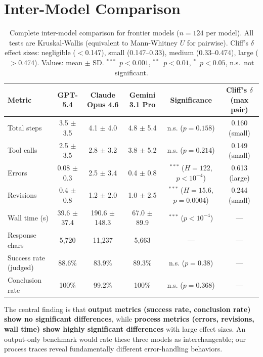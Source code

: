 \documentclass{article}
\begin{document}
\section{Inter-Model Comparison}
\label{app:models}

\begin{table}[h]
\caption{Complete inter-model comparison for frontier models ($n{=}124$ per model). All tests are Kruskal-Wallis (equivalent to Mann-Whitney $U$ for pairwise). Cliff's $\delta$ effect sizes: negligible ($<$0.147), small (0.147--0.33), medium (0.33--0.474), large ($>$0.474). Values: mean $\pm$ SD. $^{***}$~$p{<}0.001$, $^{**}$~$p{<}0.01$, $^{*}$~$p{<}0.05$, n.s.~not significant.}
\label{tab:model_detailed}
\centering\small
\begin{tabular}{lccccc}
\toprule
\textbf{Metric} & \textbf{GPT-5.4} & \textbf{Claude Opus 4.6} & \textbf{Gemini 3.1 Pro} & \textbf{Significance} & \textbf{Cliff's $\delta$ (max pair)} \\
\midrule
Total steps & 3.5 $\pm$ 3.5 & 4.1 $\pm$ 4.0 & 4.8 $\pm$ 5.4 & n.s. ($p{=}0.158$) & 0.160 (small) \\
Tool calls & 2.5 $\pm$ 3.5 & 2.8 $\pm$ 3.2 & 3.8 $\pm$ 5.2 & n.s. ($p{=}0.214$) & 0.149 (small) \\
Errors & 0.08 $\pm$ 0.3 & 2.5 $\pm$ 3.4 & 0.4 $\pm$ 0.8 & $^{***}$ ($H{=}122$, $p{<}10^{-4}$) & 0.613 (large) \\
Revisions & 0.4 $\pm$ 0.8 & 1.2 $\pm$ 2.0 & 1.0 $\pm$ 2.5 & $^{***}$ ($H{=}15.6$, $p{=}0.0004$) & 0.244 (small) \\
Wall time (s) & 39.6 $\pm$ 37.4 & 190.6 $\pm$ 148.3 & 67.0 $\pm$ 89.9 & $^{***}$ ($p{<}10^{-4}$) & --- \\
Response chars & 5,720 & 11,237 & 5,663 & --- & --- \\
Success rate (judged) & 88.6\% & 83.9\% & 89.3\% & n.s. ($p{=}0.38$) & --- \\
Conclusion rate & 100\% & 99.2\% & 100\% & n.s. ($p{=}0.368$) & --- \\
\bottomrule
\end{tabular}
\end{table}

The central finding is that \textbf{output metrics (success rate, conclusion rate) show no significant differences}, while \textbf{process metrics (errors, revisions, wall time) show highly significant differences} with large effect sizes. An output-only benchmark would rate these three models as interchangeable; our process traces reveal fundamentally different error-handling behaviors.
\end{document}
